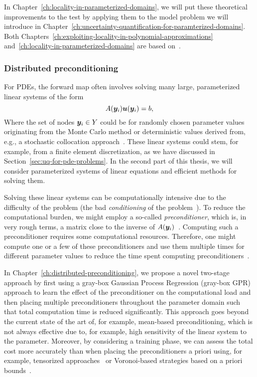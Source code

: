 In Chapter~\ref{ch:locality-in-parameterized-domains}, we will put these theoretical improvements to the test by applying them to the model problem we will introduce in Chapter~\ref{ch:uncertainty-quantification-for-paramterized-domains}.
Both Chapters~\ref{ch:exploiting-locality-in-polynomial-approximations} and~\ref{ch:locality-in-parameterized-domains} are based on~\cite{vanharten2024}.

\subsubsection{Distributed preconditioning}
For PDEs, the forward map often involves solving many large, parameterized linear systems of the form
\begin{equation*}
    A({\bm{y}_i}){\bm{u}}({\bm{y}_i})=b,
\end{equation*}
Where the set of nodes ${\bm{y}_i}\in Y$ could be for randomly chosen parameter values originating from the Monte Carlo method or deterministic values derived from, e.g., a stochastic collocation approach~\cite{xiu2015}.
These linear systems could stem, for example, from a finite element discretization, as we have discussed in Section~\ref{sec:uq-for-pde-problems}.
In the second part of this thesis, we will consider parameterized systems of linear equations and efficient methods for solving them.

Solving these linear systems can be computationally intensive due to the difficulty of the problem (the bad \emph{conditioning} of the problem~\cite{golub2007}).
To reduce the computational burden, we might employ a so-called \emph{preconditioner}, which is, in very rough terms, a matrix close to the inverse of $A({\bm{y}_i})$~\cite{wathen2015}.
Computing such a preconditioner requires some computational resources.
Therefore, one might compute one or a few of these preconditioners and use them multiple times for different parameter values to reduce the time spent computing preconditioners~\cite[Section~4.7]{venkovic2024,pembery2020}.

In Chapter~\ref{ch:distributed-preconditioning}, we propose a novel two-stage approach by first using a gray-box Gaussian Process Regression (gray-box GPR) approach to learn the effect of the preconditioner on the computational load and then placing multiple preconditioners throughout the parameter domain such that total computation time is reduced significantly.
This approach goes beyond the current state of the art of, for example, mean-based preconditioning, which is not always effective due to, for example, high sensitivity of the linear system to the parameter.
Moreover, by considering a training phase, we can assess the total cost more accurately than when placing the preconditioners a priori using, for example, tensorized approaches~\cite[Section~4.3]{pembery2020} or Voronoi-based strategies based on a priori bounds~\cite{venkovic2024}.

